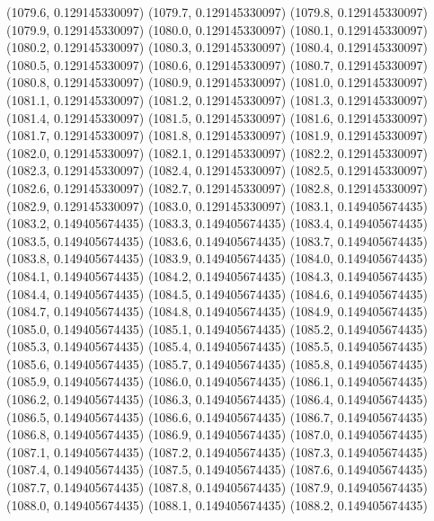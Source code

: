 {					(1079.6, 0.129145330097)
					(1079.7, 0.129145330097)
					(1079.8, 0.129145330097)
					(1079.9, 0.129145330097)
					(1080.0, 0.129145330097)
					(1080.1, 0.129145330097)
					(1080.2, 0.129145330097)
					(1080.3, 0.129145330097)
					(1080.4, 0.129145330097)
					(1080.5, 0.129145330097)
					(1080.6, 0.129145330097)
					(1080.7, 0.129145330097)
					(1080.8, 0.129145330097)
					(1080.9, 0.129145330097)
					(1081.0, 0.129145330097)
					(1081.1, 0.129145330097)
					(1081.2, 0.129145330097)
					(1081.3, 0.129145330097)
					(1081.4, 0.129145330097)
					(1081.5, 0.129145330097)
					(1081.6, 0.129145330097)
					(1081.7, 0.129145330097)
					(1081.8, 0.129145330097)
					(1081.9, 0.129145330097)
					(1082.0, 0.129145330097)
					(1082.1, 0.129145330097)
					(1082.2, 0.129145330097)
					(1082.3, 0.129145330097)
					(1082.4, 0.129145330097)
					(1082.5, 0.129145330097)
					(1082.6, 0.129145330097)
					(1082.7, 0.129145330097)
					(1082.8, 0.129145330097)
					(1082.9, 0.129145330097)
					(1083.0, 0.129145330097)
					(1083.1, 0.149405674435)
					(1083.2, 0.149405674435)
					(1083.3, 0.149405674435)
					(1083.4, 0.149405674435)
					(1083.5, 0.149405674435)
					(1083.6, 0.149405674435)
					(1083.7, 0.149405674435)
					(1083.8, 0.149405674435)
					(1083.9, 0.149405674435)
					(1084.0, 0.149405674435)
					(1084.1, 0.149405674435)
					(1084.2, 0.149405674435)
					(1084.3, 0.149405674435)
					(1084.4, 0.149405674435)
					(1084.5, 0.149405674435)
					(1084.6, 0.149405674435)
					(1084.7, 0.149405674435)
					(1084.8, 0.149405674435)
					(1084.9, 0.149405674435)
					(1085.0, 0.149405674435)
					(1085.1, 0.149405674435)
					(1085.2, 0.149405674435)
					(1085.3, 0.149405674435)
					(1085.4, 0.149405674435)
					(1085.5, 0.149405674435)
					(1085.6, 0.149405674435)
					(1085.7, 0.149405674435)
					(1085.8, 0.149405674435)
					(1085.9, 0.149405674435)
					(1086.0, 0.149405674435)
					(1086.1, 0.149405674435)
					(1086.2, 0.149405674435)
					(1086.3, 0.149405674435)
					(1086.4, 0.149405674435)
					(1086.5, 0.149405674435)
					(1086.6, 0.149405674435)
					(1086.7, 0.149405674435)
					(1086.8, 0.149405674435)
					(1086.9, 0.149405674435)
					(1087.0, 0.149405674435)
					(1087.1, 0.149405674435)
					(1087.2, 0.149405674435)
					(1087.3, 0.149405674435)
					(1087.4, 0.149405674435)
					(1087.5, 0.149405674435)
					(1087.6, 0.149405674435)
					(1087.7, 0.149405674435)
					(1087.8, 0.149405674435)
					(1087.9, 0.149405674435)
					(1088.0, 0.149405674435)
					(1088.1, 0.149405674435)
					(1088.2, 0.149405674435)
}
